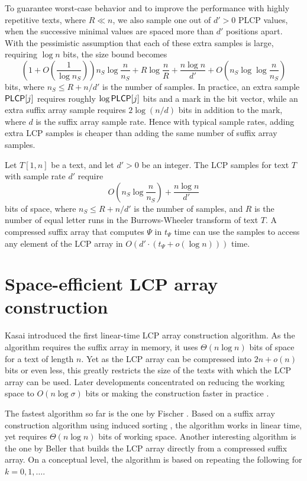 To guarantee worst-case behavior and to improve the performance with highly repetitive texts, where $R \ll n$, we also sample one out of $d' > 0$ PLCP values, when the successive minimal values are spaced more than $d'$ positions apart. With the pessimistic assumption that each of these extra samples is large, requiring $\log n$ bits, the size bound becomes
$$
\left( 1 + O\left( \frac{1}{\log n_{S}} \right) \right) n_{S} \log \frac{n}{n_{S}} +
R \log \frac{n}{R} +
\frac{n \log n}{d'} +
O\left( n_{S} \log \log \frac{n}{n_{S}} \right)
$$
bits, where $n_{S} \le R + n/d'$ is the number of samples. In practice, an extra sample $\mathsf{PLCP}[j]$ requires roughly $\log \mathsf{PLCP}[j]$ bits and a mark in the bit vector, while an extra suffix array sample requires $2 \log (n/d)$ bits in addition to the mark, where $d$ is the suffix array sample rate. Hence with typical sample rates, adding extra LCP samples is cheaper than adding the same number of suffix array samples.

\begin{theorem}\label{theorem:sampled lcp}
Let $T[1,n]$ be a text, and let $d' > 0$ be an integer. The LCP samples for text $T$ with sample rate $d'$ require
$$
O\left(  n_{S} \log \frac{n}{n_{S}} \right) + \frac{n \log n}{d'}
$$
bits of space, where $n_{S} \le R + n/d'$ is the number of samples, and $R$ is the number of equal letter runs in the Burrows-Wheeler transform of text $T$. A compressed suffix array that computes $\Psi$ in $t_{\Psi}$ time can use the samples to access any element of the LCP array in $O(d' \cdot (t_{\Psi} + o(\log n)))$ time.
\end{theorem}


\section{Space-efficient LCP array construction}

Kasai  introduced the first linear-time LCP array construction algorithm. As the algorithm requires the suffix array in memory, it uses $\Theta(n \log n)$ bits of space for a text of length $n$. Yet as the LCP array can be compressed into $2n + o(n)$ bits or even less, this greatly restricts the size of the texts with which the LCP array can be used. Later developments concentrated on reducing the working space to $O(n \log \sigma)$ bits \cite{Puglisi2008,Kaerkkaeinen2009,Gog2011,Beller2011} or making the construction faster in practice \cite{Kaerkkaeinen2009,Gog2011,Fischer2011}.

The fastest algorithm so far is the one by Fischer \cite{Fischer2011}. Based on a suffix array construction algorithm using induced sorting \cite{Nong2009a}, the algorithm works in linear time, yet requires $\Theta(n \log n)$ bits of working space. Another interesting algorithm is the one by Beller  that builds the LCP array directly from a compressed suffix array. On a conceptual level, the algorithm is based on repeating the following for $k = 0, 1, \dotsc$.

